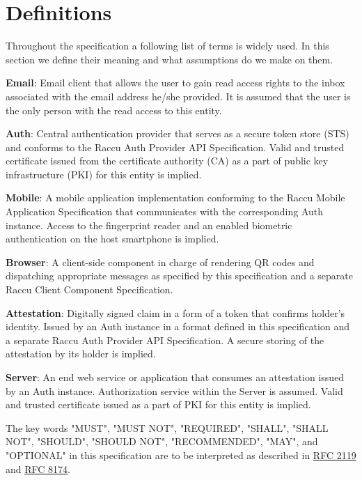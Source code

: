 \section{Definitions}
Throughout the specification a following list of terms is widely used. In this section we define their meaning 
and what assumptions do we make on them.

\medskip
\textbf{Email}: Email client that allows the user to gain read access rights to the inbox associated
with the email address he/she provided. It is assumed that the user is the only person with the read access 
to this entity.

\medskip
\textbf{Auth}: Central authentication provider that serves as a secure token store (STS) and conforms to 
the Raccu Auth Provider API Specification. Valid and trusted certificate issued from the certificate authority (CA)
as a part of public key infrastructure (PKI) for this entity is implied.

\medskip
\textbf{Mobile}: A mobile application implementation conforming to the Raccu Mobile Application Specification 
that communicates with the corresponding Auth instance. Access to the fingerprint reader and an enabled biometric 
authentication on the host smartphone is implied.

\medskip
\textbf{Browser}: A client-side component in charge of rendering QR codes and dispatching appropriate messages 
as specified by this specification and a separate Raccu Client Component Specification. 

\medskip
\textbf{Attestation}: Digitally signed claim in a form of a token that confirms holder's identity. Issued by 
an Auth instance in a format defined in this specification and a separate Raccu Auth Provider API Specification. 
A secure storing of the attestation by its holder is implied.

\medskip
\textbf{Server}: An end web service or application that consumes an attestation issued by an Auth instance. 
Authorization service within the Server is assumed. Valid and trusted certificate issued as a part of PKI 
for this entity is implied.

\medskip
The key words "MUST", "MUST NOT", "REQUIRED", "SHALL", "SHALL NOT", "SHOULD", "SHOULD NOT", "RECOMMENDED", 
"MAY", and "OPTIONAL" in this specification are to be interpreted as described in 
\href{https://tools.ietf.org/html/rfc2119}{RFC 2119} and \href{https://tools.ietf.org/html/rfc8174}{RFC 8174}.